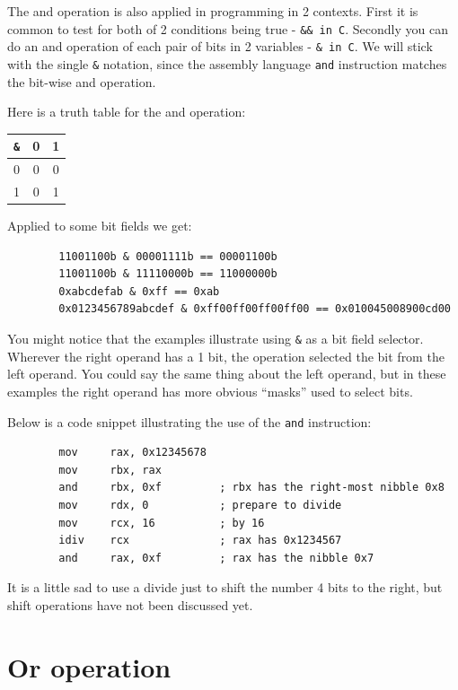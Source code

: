 \documentclass[11pt,b5paper]{book}
\begin{document}
The and operation is also applied in programming in 2 contexts. 
First it is common to test for both of 2 conditions being true - {\tt \&\& in C}.
Secondly you can do an and operation of each pair of bits in 2 variables -
{\tt \& in C}.
We will stick with the single {\tt \&} notation, since the assembly language
{\tt and} instruction matches the bit-wise and operation.

Here is a truth table for the and operation:

\begin{center}
\begin{tabular}{c|cc}
{\tt \&} & 0 & 1 \\
\hline
0       & 0 & 0 \\
1       & 0 & 1 \\
\end{tabular}
\end{center}

Applied to some bit fields we get:

\begin{verbatim}
        11001100b & 00001111b == 00001100b
        11001100b & 11110000b == 11000000b
        0xabcdefab & 0xff == 0xab
        0x0123456789abcdef & 0xff00ff00ff00ff00 == 0x010045008900cd00
\end{verbatim}

You might notice that the examples illustrate using {\tt \&} as a bit field
selector.
Wherever the right operand has a 1 bit, the operation selected the bit from the
left operand.
You could say the same thing about the left operand, but in these examples the
right operand has more obvious ``masks'' used to select bits.

Below is a code snippet illustrating the use of the {\tt and} instruction:

\begin{verbatim}
        mov     rax, 0x12345678
        mov     rbx, rax
        and     rbx, 0xf         ; rbx has the right-most nibble 0x8
        mov     rdx, 0           ; prepare to divide
        mov     rcx, 16          ; by 16
        idiv    rcx              ; rax has 0x1234567
        and     rax, 0xf         ; rax has the nibble 0x7
\end{verbatim}

It is a little sad to use a divide just to shift the number 4 bits to the
right, but shift operations have not been discussed yet.

\section{Or operation}
\end{document}

